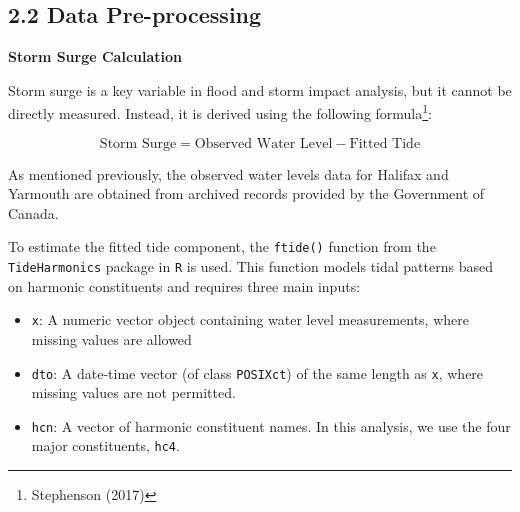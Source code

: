 \documentclass[
  letterpaper,
  DIV=11,
  numbers=noendperiod]{scrartcl}
\begin{document}
\begin{table}[h]
\centering
{}
\caption{Data description summary}
\end{table}

\subsection{2.2 Data Pre-processing}\label{data-pre-processing}

\textbf{Storm Surge Calculation}

Storm surge is a key variable in flood and storm impact analysis, but it
cannot be directly measured. Instead, it is derived using the following
formula\footnote{Stephenson (2017)}:

\[
\text{Storm Surge} = \text{Observed Water Level} - \text{Fitted Tide}
\]

As mentioned previously, the observed water levels data for Halifax and
Yarmouth are obtained from archived records provided by the Government
of Canada.

To estimate the fitted tide component, the \texttt{ftide()} function
from the \texttt{TideHarmonics} package in \texttt{R} is used. This
function models tidal patterns based on harmonic constituents and
requires three main inputs:

\begin{itemize}
\item
  \texttt{x}: A numeric vector object containing water level
  measurements, where missing values are allowed
\item
  \texttt{dto}: A date-time vector (of class \texttt{POSIXct}) of the
  same length as \texttt{x}, where missing values are not permitted.
\item
  \texttt{hcn}: A vector of harmonic constituent names. In this
  analysis, we use the four major constituents, \texttt{hc4}.
\end{itemize}
\end{document}
